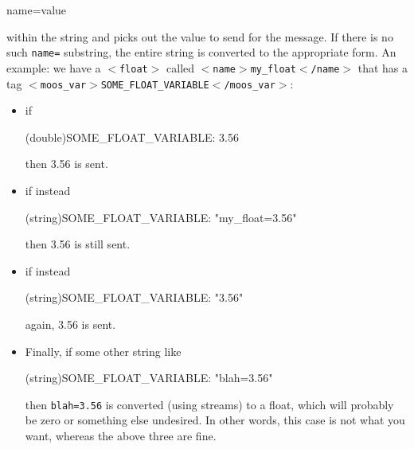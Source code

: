 \documentclass[11pt, letterpaper, oneside]{memoir}
\newcommand{\xmltag}[1]{\texttt{$<$#1$>$}}
\begin{document}
\begin{itemize}
\begin{small}
\begin{boxedverbatim}
name=value
\end{boxedverbatim}
\resetbvlinenumber
\end{small}
within the string and picks out the value to send for the message. If there is no such \verb|name=| substring, the entire string is converted to the appropriate form. An example: we have a \xmltag{float} called \xmltag{name$>$my\_float$<$/name} that has a tag \xmltag{moos\_var$>$SOME\_FLOAT\_VARIABLE$<$/moos\_var}: 
\begin{itemize}
\item if
\begin{small}
\begin{boxedverbatim}
(double)SOME_FLOAT_VARIABLE: 3.56
\end{boxedverbatim}
\resetbvlinenumber
\end{small}
then 3.56 is sent.
\item if instead 
\begin{small}
\begin{boxedverbatim}
(string)SOME_FLOAT_VARIABLE: "my_float=3.56"
\end{boxedverbatim}
\resetbvlinenumber
\end{small}
then 3.56 is still sent.
\item if instead
\begin{small}
\begin{boxedverbatim}
(string)SOME_FLOAT_VARIABLE: "3.56"
\end{boxedverbatim}
\resetbvlinenumber
\end{small}
again, 3.56 is sent.
\item Finally, if some other string like
\begin{small}
\begin{boxedverbatim}
(string)SOME_FLOAT_VARIABLE: "blah=3.56"
\end{boxedverbatim}
\resetbvlinenumber
\end{small}
then \verb|blah=3.56| is converted (using streams) to a float, which will probably be zero or something else undesired. In other words, this case is not what you want, whereas the above three are fine.
\end{itemize}
\end{itemize}
\end{document}
